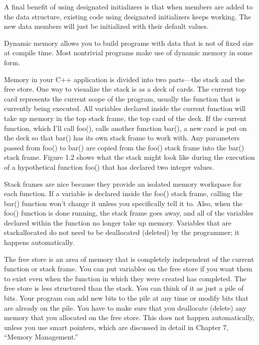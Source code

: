 A final benefit of using designated initializers is that when members are added to the data structure, existing code using designated initializers keeps working. The new data members will just be initialized with their default values.


Dynamic memory allows you to build programs with data that is not of fixed size at compile time. Most nontrivial programs make use of dynamic memory in some form.



Memory in your C++ application is divided into two parts—the stack and the free store. One way to visualize the stack is as a deck of cards. The current top card represents the current scope of the program, usually the function that is currently being executed. All variables declared inside the current function will take up memory in the top stack frame, the top card of the deck. If the current function, which I’ll call foo(), calls another function bar(), a new card is put on the deck so that bar() has its own stack frame to work with. Any parameters passed from foo() to bar() are copied from the foo() stack frame into the bar() stack frame. Figure 1.2 shows what the stack might look like during the execution of a hypothetical function foo() that has declared two integer values.

Stack frames are nice because they provide an isolated memory workspace for each function. If a variable is declared inside the foo() stack frame, calling the bar() function won’t change it unless you specifically tell it to. Also, when the foo() function is done running, the stack frame goes away, and all of the variables declared within the function no longer take up memory. Variables that are stackallocated do not need to be deallocated (deleted) by the programmer; it happens automatically.

The free store is an area of memory that is completely independent of the current function or stack frame. You can put variables on the free store if you want them to exist even when the function in which they were created has completed. The free store is less structured than the stack. You can think of it as just a pile of bits. Your program can add new bits to the pile at any time or modify bits that are already on the pile. You have to make sure that you deallocate (delete) any memory that you allocated on the free store. This does not happen automatically, unless you use smart pointers, which are discussed in detail in Chapter 7, “Memory Management.”

